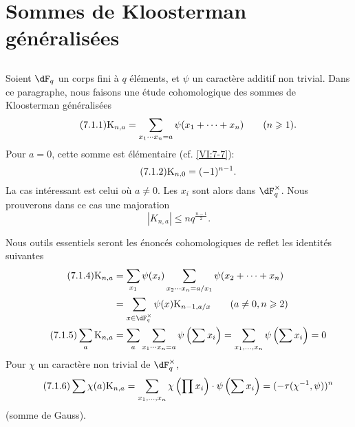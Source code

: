 \section{Sommes de Kloosterman g\'en\'eralis\'ees}\label{VI:7}





\subsection{}\label{VI:7-1}

Soient $\dF_q$ un corps fini \`a $q$ \'el\'ements, et $\psi$ un caract\`ere 
additif non trivial. Dans ce paragraphe, nous faisons une \'etude cohomologique 
des sommes de Kloosterman g\'en\'eralis\'ees 
\begin{equation*}\tag{7.1.1}\label{VI;eq:7-1-1}
  \textnormal{K}_{n,a} = \sum_{x_1\dotsm x_n = a} \psi(x_1+\cdots + x_n) \qquad (n\geqslant 1) \text{.} 
\end{equation*}
Pour $a=0$, cette somme est \'el\'ementaire (cf. \ref{VI:7-7}): 
\begin{equation*}\tag{7.1.2}\label{VI:eq:7-1-2}
  \textnormal{K}_{n,0} = (-1)^{n-1} \text{.} 
\end{equation*}
La cas int\'eressant est celui o\`u $a\ne 0$. Les $x_i$ sont alors dans 
$\dF_q^\times$. Nous prouverons dans ce cas une majoration 
\begin{equation*}\tag{7.1.3}\label{VI:eq:7-1-3}
  \left|K_{n,a}\right| \leqslant n q^{\frac{n-1}{2}} \text{.} 
\end{equation*}

Nous outils essentiels seront les \'enonc\'es cohomologiques de reflet les 
identit\'es suivantes 
\begin{align*}\tag{7.1.4}\label{VI:eq:7-1-4}
  \kloos_{n,a} &= \sum_{x_1} \psi(x_i) \sum_{x_2\dotsm x_n = a/x_1} \psi(x_2+\cdots + x_n) \\ \notag
    &= \sum_{x\in \dF_q^\times} \psi(x) \kloos_{n-1,a/x} \qquad (a\ne 0,n\geqslant 2) \\ \tag{7.1.5}\label{VI:eq:7-1-5}
  \sum_a \kloos_{n,a} &= \sum_a \sum_{x_1 \dotsm x_n = a} \psi\left(\sum x_i\right) = \sum_{x_1,\dots,x_n} \psi\left(\sum x_i\right) = 0 
\end{align*}
Pour $\chi$ un caract\`ere non trivial de $\dF_q^\times$, 
\begin{equation*}\tag{7.1.6}\label{VI:eq:7-1-6}
  \sum \chi(a) \textnormal{K}_{n,a} = \sum_{x_1,\dots,x_n} \chi\left(\prod x_i\right) \cdot \psi\left(\sum x_i\right) = (-\tau(\chi^{-1},\psi))^n 
\end{equation*}
(somme de Gauss). 






